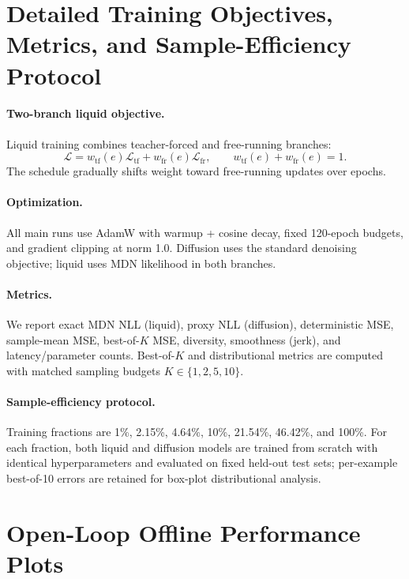 \documentclass{article}
\begin{document}
\newpage
\appendix

\section{Detailed Training Objectives, Metrics, and Sample-Efficiency Protocol}\label{app:training-metrics}

\paragraph{Two-branch liquid objective.}
Liquid training combines teacher-forced and free-running branches:
\begin{equation}
\mathcal{L}=w_{\mathrm{tf}}(e)\mathcal{L}_{\mathrm{tf}}+w_{\mathrm{fr}}(e)\mathcal{L}_{\mathrm{fr}},\qquad
w_{\mathrm{tf}}(e)+w_{\mathrm{fr}}(e)=1.
\end{equation}
The schedule gradually shifts weight toward free-running updates over epochs.

\paragraph{Optimization.}
All main runs use AdamW with warmup + cosine decay, fixed 120-epoch budgets, and gradient clipping at norm 1.0. Diffusion uses the standard denoising objective; liquid uses MDN likelihood in both branches.

\paragraph{Metrics.}
We report exact MDN NLL (liquid), proxy NLL (diffusion), deterministic MSE, sample-mean MSE, best-of-$K$ MSE, diversity, smoothness (jerk), and latency/parameter counts. Best-of-$K$ and distributional metrics are computed with matched sampling budgets $K\in\{1,2,5,10\}$.

\paragraph{Sample-efficiency protocol.}
Training fractions are 1\%, 2.15\%, 4.64\%, 10\%, 21.54\%, 46.42\%, and 100\%. For each fraction, both liquid and diffusion models are trained from scratch with identical hyperparameters and evaluated on fixed held-out test sets; per-example best-of-10 errors are retained for box-plot distributional analysis.

\section{Open-Loop Offline Performance Plots}\label{app:offline-plots}
\end{document}
